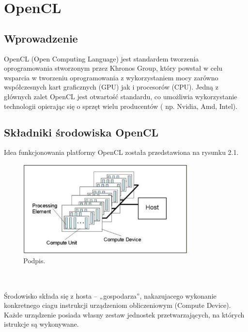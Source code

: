 \chapter{OpenCL}
\label{t:int}

\section{Wprowadzenie}
OpenCL (Open Computing Language) jest standardem tworzenia oprogramowania stworzonym przez Khronos Group, który powstał w celu wsparcia w tworzeniu oprogramowania z wykorzystaniem mocy zarówno współczesnych kart graficznych (GPU) jak i procesorów (CPU). Jedną z głównych zalet OpenCL jest otwartość standardu, co umożliwia wykorzystanie technologii opierając się o sprzęt wielu producentów ( np. Nvidia, Amd, Intel).

\section{Składniki środowiska OpenCL}
Idea funkcjonowania platformy OpenCL została przedstawiona na rysunku 2.1. \\
\begin{figure}[h]
\centering
\includegraphics[width=0.8\textwidth]{figures/opencl_platform_model.png}
\caption{Podpis.}%
\label{rys:etykieta}
\end{figure} \\ \\
Środowisko składa się z hosta – „gospodarza”, nakazujacego wykonanie konkretnego ciagu instrukcji urządzeniom obliczeniowym (Compute Device). Każde urządzenie posiada własny zestaw jednostek przetwarzających, na których istrukcje są wykonywane.

